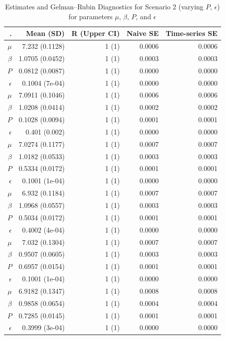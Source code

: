 \documentclass[
  letterpaper,
  double,
  12pt,
  1.0in]{beavtex}
\begin{document}
\begin{table}[ht]
\centering
\begin{tabular}{|r|r|r|r|r|}
  \hline
. & Mean (SD) & R (Upper CI) & Naive SE & Time-series SE \\ 
  \hline
$\mu$ & 7.232 (0.1128) & 1 (1) & 0.0006 & 0.0006 \\ 
  $\beta$ & 1.0705 (0.0452) & 1 (1) & 0.0003 & 0.0003 \\ 
  $P$ & 0.0812 (0.0087) & 1 (1) & 0.0000 & 0.0000 \\ 
  $\epsilon$ & 0.1004 (7e-04) & 1 (1) & 0.0000 & 0.0000 \\ 
   \hline 
$\mu$ & 7.0911 (0.1046) & 1 (1) & 0.0006 & 0.0006 \\ 
  $\beta$ & 1.0208 (0.0414) & 1 (1) & 0.0002 & 0.0002 \\ 
  $P$ & 0.1028 (0.0094) & 1 (1) & 0.0001 & 0.0001 \\ 
  $\epsilon$ & 0.401 (0.002) & 1 (1) & 0.0000 & 0.0000 \\ 
   \hline 
$\mu$ & 7.0274 (0.1177) & 1 (1) & 0.0007 & 0.0007 \\ 
  $\beta$ & 1.0182 (0.0533) & 1 (1) & 0.0003 & 0.0003 \\ 
  $P$ & 0.5334 (0.0172) & 1 (1) & 0.0001 & 0.0001 \\ 
  $\epsilon$ & 0.1001 (1e-04) & 1 (1) & 0.0000 & 0.0000 \\ 
   \hline 
$\mu$ & 6.932 (0.1184) & 1 (1) & 0.0007 & 0.0007 \\ 
  $\beta$ & 1.0968 (0.0557) & 1 (1) & 0.0003 & 0.0003 \\ 
  $P$ & 0.5034 (0.0172) & 1 (1) & 0.0001 & 0.0001 \\ 
  $\epsilon$ & 0.4002 (4e-04) & 1 (1) & 0.0000 & 0.0000 \\ 
   \hline 
$\mu$ & 7.032 (0.1304) & 1 (1) & 0.0007 & 0.0007 \\ 
  $\beta$ & 0.9507 (0.0605) & 1 (1) & 0.0003 & 0.0003 \\ 
  $P$ & 0.6957 (0.0154) & 1 (1) & 0.0001 & 0.0001 \\ 
  $\epsilon$ & 0.1001 (1e-04) & 1 (1) & 0.0000 & 0.0000 \\ 
   \hline 
$\mu$ & 6.9182 (0.1347) & 1 (1) & 0.0008 & 0.0008 \\ 
  $\beta$ & 0.9858 (0.0654) & 1 (1) & 0.0004 & 0.0004 \\ 
  $P$ & 0.7285 (0.0145) & 1 (1) & 0.0001 & 0.0001 \\ 
  $\epsilon$ & 0.3999 (3e-04) & 1 (1) & 0.0000 & 0.0000 \\ 
   \hline
\end{tabular}
\caption{Estimates and Gelman--Rubin Diagnostics for Scenario 2 (varying $P$, $\epsilon$) for parameters $\mu$, $\beta$, $P$, and $\epsilon$} 
\end{table}
\end{document}
